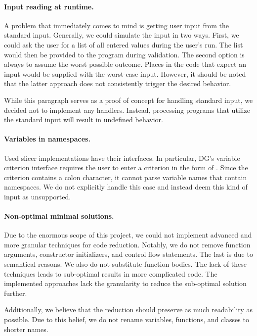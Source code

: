 \paragraph{Input reading at runtime.}
A problem that immediately comes to mind is getting user input from 
the standard input. 
Generally, we could simulate the input in two ways. 
First, we could ask the user for a list of all entered values during 
the user's run. 
The list would then be provided to the program during validation. 
The second option is always to assume the worst possible outcome. 
Places in the code that expect an input would be supplied with 
the worst-case input. 
However, it should be noted that the latter approach does not consistently 
trigger the desired behavior.

While this paragraph serves as a proof of concept for handling standard 
input, we decided not to implement any handlers. 
Instead, processing programs that utilize the standard input will result in 
undefined behavior.


\paragraph{Variables in namespaces.}
Used slicer implementations have their interfaces. 
In particular, DG's variable criterion interface requires the user to enter 
a criterion in the form of . 
Since the criterion contains a colon character, it cannot parse variable 
names that contain namespaces. 
We do not explicitly handle this case and instead deem this kind of input as 
unsupported.

\paragraph{Non-optimal minimal solutions.}
Due to the enormous scope of this project, we could not implement advanced 
and more granular techniques for code reduction. 
Notably, we do not remove function arguments, constructor initializers, and 
control flow statements. 
The last is due to semantical reasons. 
We also do not substitute function bodies. 
The lack of these techniques leads to sub-optimal results in more 
complicated code. 
The implemented approaches lack the granularity to reduce the sub-optimal 
solution further. 

Additionally, we believe that the reduction should preserve as much 
readability as possible. 
Due to this belief, we do not rename variables, functions, and classes to 
shorter names.

